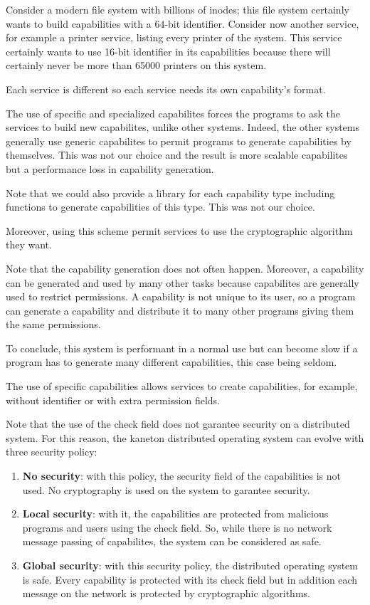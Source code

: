 \begin{multicols}{2}
Consider a modern file system with billions of inodes; this file system
certainly wants to build capabilities with a 64-bit identifier.
Consider now another service, for example a printer service, listing
every printer of the system. This service certainly wants to use 16-bit
identifier in its capabilities because there will certainly never be more than
65000 printers on this system.

Each service is different so each service needs its own capability's format.

The use of specific and specialized capabilites forces the programs to ask
the services to build new capabilites, unlike other systems. Indeed,
the other systems generally use generic capabilites to permit programs to
generate capabilities by themselves. This was not our choice and the result is
more scalable capabilites but a performance loss in capability generation.

Note that we could also provide a library for each capability type including
functions to generate capabilities of this type. This was not our choice.

Moreover, using this scheme permit services to use the cryptographic algorithm
they want.

Note that the capability generation does not often happen. Moreover,
a capability can be generated and used by many other tasks because
capabilites are generally used to restrict permissions. A capability
is not unique to its user, so a program can generate a capability and
distribute it to many other programs giving them the same permissions.

To conclude, this system is performant in a normal use but can become
slow if a program has to generate many different capabilities, this case
being seldom.

The use of specific capabilities allows services to create capabilities,
for example, without identifier or with extra permission fields.

Note that the use of the check field does not garantee security on a
distributed system. For this reason, the kaneton distributed operating
system can evolve with three security policy:

\begin{enumerate}
  \item
    \textbf{No security}: with this policy, the security field of the
    capabilities is not used. No cryptography is used on the system
    to garantee security.
  \item
    \textbf{Local security}: with it, the capabilities are protected from
    malicious programs and users using the check field. So, while there
    is no network message passing of capabilites, the system can be
    considered as safe.
  \item
    \textbf{Global security}: with this security policy, the distributed
    operating system is safe. Every capability is protected with its check
    field but in addition each message on the network is protected by
    cryptographic algorithms.
\end{enumerate}


\end{multicols}
